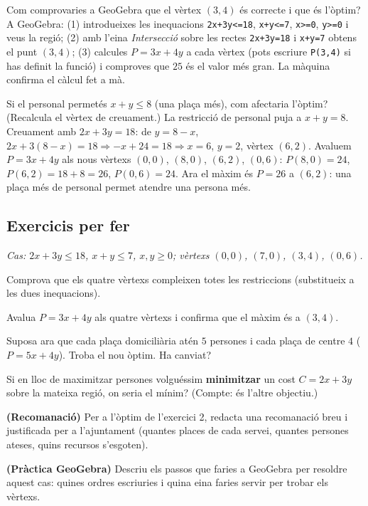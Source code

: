 \begin{exresolt}
Com comprovaries a GeoGebra que el vèrtex $(3,4)$ és correcte i que és l'òptim?
\solucio
A GeoGebra: (1) introdueixes les inequacions \texttt{2x+3y<=18}, \texttt{x+y<=7},
\texttt{x>=0}, \texttt{y>=0} i veus la regió; (2) amb l'eina \emph{Intersecció} sobre
les rectes \texttt{2x+3y=18} i \texttt{x+y=7} obtens el punt $(3,4)$; (3) calcules
$P=3x+4y$ a cada vèrtex (pots escriure \texttt{P(3,4)} si has definit la funció) i
comproves que $25$ és el valor més gran. La màquina confirma el càlcul fet a mà.
\end{exresolt}

\begin{exresolt}
Si el personal permetés $x+y\le 8$ (una plaça més), com afectaria l'òptim? (Recalcula
el vèrtex de creuament.)
\solucio
La restricció de personal puja a $x+y=8$. Creuament amb $2x+3y=18$: de $y=8-x$,
$2x+3(8-x)=18\Rightarrow -x+24=18\Rightarrow x=6$, $y=2$, vèrtex $(6,2)$. Avaluem
$P=3x+4y$ als nous vèrtexs $(0,0)$, $(8,0)$, $(6,2)$, $(0,6)$:
$P(8,0)=24$, $P(6,2)=18+8=26$, $P(0,6)=24$. Ara el màxim és $P=26$ a $(6,2)$: una
plaça més de personal permet atendre una persona més.
\end{exresolt}

\subsection{Exercicis per fer}

\noindent\textit{Cas: $2x+3y\le 18$, $x+y\le 7$, $x,y\ge 0$; vèrtexs $(0,0)$, $(7,0)$,
$(3,4)$, $(0,6)$.}

\begin{exercicis}
\begin{exlist}
  \item Comprova que els quatre vèrtexs compleixen totes les restriccions (substitueix
        a les dues inequacions).
  \item Avalua $P=3x+4y$ als quatre vèrtexs i confirma que el màxim és a $(3,4)$.
  \item Suposa ara que cada plaça domiciliària atén $5$ persones i cada plaça de centre
        $4$ ($P=5x+4y$). Troba el nou òptim. Ha canviat?
  \item Si en lloc de maximitzar persones volguéssim \textbf{minimitzar} un cost
        $C=2x+3y$ sobre la mateixa regió, on seria el mínim? (Compte: és l'altre
        objectiu.)
  \item \textbf{(Recomanació)} Per a l'òptim de l'exercici 2, redacta una recomanació
        breu i justificada per a l'ajuntament (quantes places de cada servei, quantes
        persones ateses, quins recursos s'esgoten).
  \item \textbf{(Pràctica GeoGebra)} Descriu els passos que faries a GeoGebra per
        resoldre aquest cas: quines ordres escriuries i quina eina faries servir per
        trobar els vèrtexs.
\end{exlist}
\end{exercicis}

